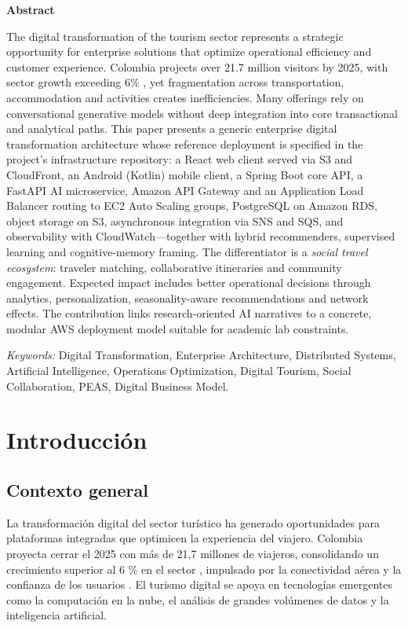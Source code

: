 \documentclass[12pt, letterpaper]{article}
\begin{document}
\noindent\textbf{Abstract}

The digital transformation of the tourism sector represents a strategic opportunity for enterprise solutions that optimize operational efficiency and customer experience. Colombia projects over 21.7 million visitors by 2025, with sector growth exceeding 6\% \citep{ref1}, yet fragmentation across transportation, accommodation and activities creates inefficiencies. Many offerings rely on conversational generative models without deep integration into core transactional and analytical paths. This paper presents a generic enterprise digital transformation architecture whose reference deployment is specified in the project's infrastructure repository: a React web client served via S3 and CloudFront, an Android (Kotlin) mobile client, a Spring Boot core API, a FastAPI AI microservice, Amazon API Gateway and an Application Load Balancer routing to EC2 Auto Scaling groups, PostgreSQL on Amazon RDS, object storage on S3, asynchronous integration via SNS and SQS, and observability with CloudWatch---together with hybrid recommenders, supervised learning and cognitive-memory framing. The differentiator is a \textit{social travel ecosystem}: traveler matching, collaborative itineraries and community engagement. Expected impact includes better operational decisions through analytics, personalization, seasonality-aware recommendations and network effects. The contribution links research-oriented AI narratives to a concrete, modular AWS deployment model suitable for academic lab constraints.

\textit{Keywords:} Digital Transformation, Enterprise Architecture, Distributed Systems, Artificial Intelligence, Operations Optimization, Digital Tourism, Social Collaboration, PEAS, Digital Business Model.

\section*{Introducción}

\subsection*{Contexto general}

La transformación digital del sector turístico ha generado oportunidades para plataformas integradas que optimicen la experiencia del viajero. Colombia proyecta cerrar el 2025 con más de 21,7 millones de viajeros, consolidando un crecimiento superior al 6 \% en el sector \citep{ref1}, impulsado por la conectividad aérea y la confianza de los usuarios \citep{ref2}. El turismo digital se apoya en tecnologías emergentes como la computación en la nube, el análisis de grandes volúmenes de datos y la inteligencia artificial.
\end{document}
